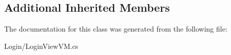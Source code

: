 \subsection*{Additional Inherited Members}


The documentation for this class was generated from the following file\+:\begin{DoxyCompactItemize}
\item 
Login/Login\+View\+V\+M.\+cs\end{DoxyCompactItemize}
